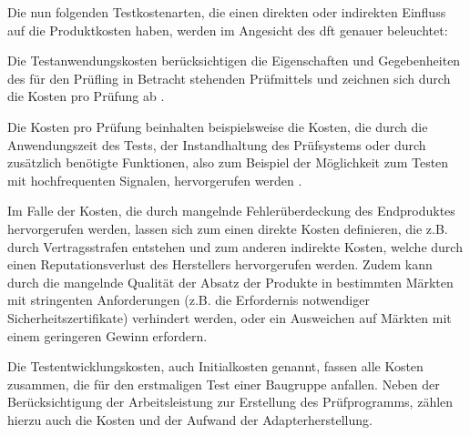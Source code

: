     Die nun folgenden Testkostenarten, die einen direkten oder indirekten Einfluss auf die Produktkosten haben, werden im Angesicht des \acs{dft} genauer beleuchtet: \cite{eggersglus_test_2014}

        Die Testanwendungskosten berücksichtigen die Eigenschaften und Gegebenheiten des für den Prüfling in Betracht stehenden Prüfmittels und zeichnen sich durch die Kosten pro Prüfung ab \cite{berger_test-_2012}.


        Die Kosten pro Prüfung beinhalten beispielsweise die Kosten, die durch die Anwendungszeit des Tests, der Instandhaltung des Prüfsystems oder durch zusätzlich benötigte Funktionen, also zum Beispiel der Möglichkeit zum Testen mit hochfrequenten Signalen, hervorgerufen werden \cite{eggersglus_test_2014}.

        Im Falle der Kosten, die durch mangelnde Fehlerüberdeckung des Endproduktes hervorgerufen werden, lassen sich zum einen direkte Kosten definieren, die z.B. durch Vertragsstrafen entstehen und zum anderen indirekte Kosten, welche durch einen Reputationsverlust des Herstellers hervorgerufen werden.
        Zudem kann durch die mangelnde Qualität der Absatz der Produkte in bestimmten Märkten mit stringenten Anforderungen (z.B. die Erfordernis notwendiger Sicherheitszertifikate) verhindert werden, oder ein Ausweichen auf Märkten mit einem geringeren Gewinn erfordern. \cite{eggersglus_test_2014}

        Die Testentwicklungskosten, auch Initialkosten genannt, fassen alle Kosten zusammen, die für den erstmaligen Test einer Baugruppe anfallen.
        Neben der Berücksichtigung der Arbeitsleistung zur Erstellung des Prüfprogramms, zählen hierzu auch die Kosten und der Aufwand der Adapterherstellung. \cite{berger_test-_2012}

